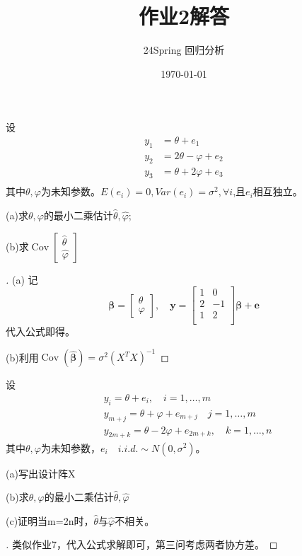 \documentclass[cn,hazy,green,12pt,normal]{elegantnote}
\title{作业2解答}
\author{24Spring 回归分析}
\date{\today}
\DeclareMathOperator{\Cov}{Cov}
\numberwithin{equation}{section}
\numberwithin{subsection}{section}
\begin{document}
\maketitle
\begin{homework}
    设
    \[
    \begin{aligned}
    y_1&=\theta+e_1\\
    y_2&=2\theta-\varphi +e_2\\
    y_3&=\theta+2\varphi +e_3\\
    \end{aligned}
    \]
    其中$\theta,\varphi$为未知参数。$E(e_i)=0,Var(e_i)=\sigma^2,\forall i$,且$e_i$相互独立。

    (a)求$\theta,\varphi$的最小二乘估计$\hat{\theta},\hat{\varphi}$;

    (b)求$\Cov\begin{bmatrix}
        \hat{\theta}\\
        \hat{\varphi}
    \end{bmatrix}$
\end{homework}
\begin{proof}[\solutionname]
   (a) 记\[
    \bm \beta = \begin{bmatrix}
        \theta\\
        \varphi
    \end{bmatrix},\quad \bm y = \begin{bmatrix}
        1&0\\
        2&-1\\
        1&2\\
    \end{bmatrix}\bm \beta +\bm e
    \]
    代入公式即得。

    (b)利用$\Cov(\bm \hat{\beta})=\sigma^2(X^TX)^{-1}$
   
\end{proof}

\begin{homework}
    设\[
    \begin{aligned}
        &y_i=\theta +e_i, \quad i=1,\dots,m\\
        &y_{m+j}=\theta +\varphi +e_{m+j}\quad j=1,\dots,m\\
        &y_{2m+k}=\theta -2\varphi +e_{2m+k},\quad k=1,\dots,n
    \end{aligned}
    \]
    其中$\theta,\varphi$为未知参数，$e_i\quad i.i.d. \sim N(0,\sigma^2)$。

    (a)写出设计阵X

    (b)求$\theta,\varphi$的最小二乘估计$\hat{\theta},\hat{\varphi}$

    (c)证明当m=2n时，$\hat{\theta}$与$\hat{\varphi}$不相关。
\end{homework}
\begin{proof}[\solutionname]
    类似作业7，代入公式求解即可，第三问考虑两者协方差。
\end{proof}
\end{document}
